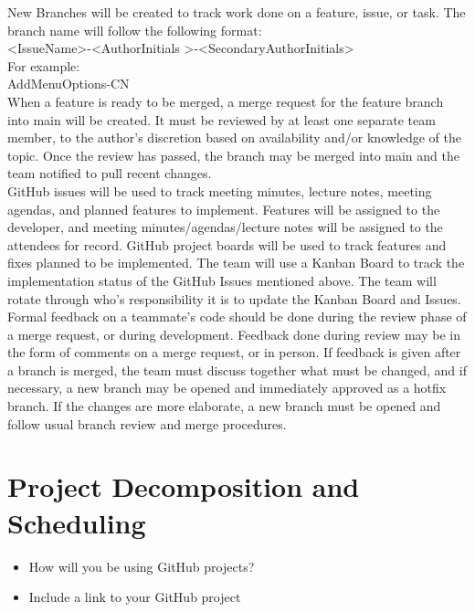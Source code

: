 \documentclass{article}
\begin{document}
New Branches will be created to track work done on a feature, issue, or task. The branch name will follow the following format: \\ 

\textless Issue\textunderscore Name\textgreater-\textless AuthorInitials \textgreater-\textless SecondaryAuthorInitials\textgreater \\

For example:  \\

Add\textunderscore Menu\textunderscore Options-CN \\

When a feature is ready to be merged, a merge request for the feature branch into main will be created. It must be reviewed by at least one separate team member, to the author’s discretion based on availability and/or knowledge of the topic. Once the review has passed, the branch may be merged into main and the team notified to pull recent changes.  \\

GitHub issues will be used to track meeting minutes, lecture notes, meeting agendas, and planned features to implement. Features will be assigned to the developer, and meeting minutes/agendas/lecture notes will be assigned to the attendees for record. GitHub project boards will be used to track features and fixes planned to be implemented. The team will use a Kanban Board to track the implementation status of the GitHub Issues mentioned above.  The team will rotate through who’s responsibility it is to update the Kanban Board and Issues.  \\

Formal feedback on a teammate’s code should be done during the review phase of a merge request, or during development. Feedback done during review may be in the form of comments on a merge request, or in person. If feedback is given after a branch is merged, the team must discuss together what must be changed, and if necessary, a new branch may be opened and immediately approved as a hotfix branch. If the changes are more elaborate, a new branch must be opened and follow usual branch review and merge procedures.  \\

\section{Project Decomposition and Scheduling}

\begin{itemize}
  \item How will you be using GitHub projects?
  \item Include a link to your GitHub project
\end{itemize}
\end{document}
